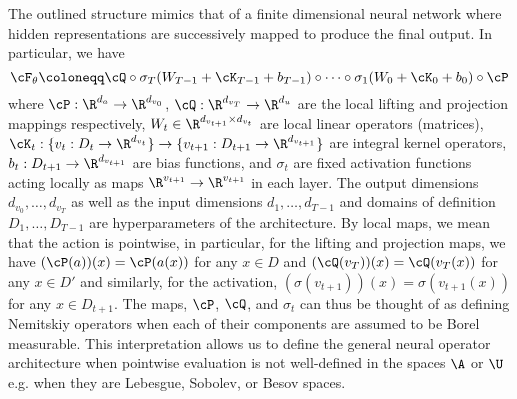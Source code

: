 The outlined structure mimics that of a finite dimensional neural network where hidden representations are successively mapped to produce the final output. In particular, we have
\begin{equation}
\label{eq:F}
    \cF_{\theta} \coloneqq \cQ \circ \sigma_T(W_{T-1} + \cK_{T-1} + b_{T-1}) \circ \cdots \circ \sigma_1(W_0 + \cK_0 + b_0) \circ \cP
\end{equation}
where \(\cP: \R^{d_a} \to \R^{d_{v_0}}\), \(\cQ: \R^{d_{v_T}} \to \R^{d_u}\) are the local lifting and projection mappings respectively, \(W_t \in \R^{d_{v_{t+1}} \times d_{v_t}}\) are local linear operators (matrices), \(\cK_t: \{v_t: D_t \to \R^{d_{v_t}}\} \to \{v_{t+1}: D_{t+1} \to \R^{d_{v_{t+1}}}\}\) are integral kernel operators, \(b_t : D_{t+1} \to \R^{d_{v_{t+1}}}\) are bias functions, and \(\sigma_t\) are fixed activation functions acting locally as maps \(\R^{v_{t+1}} \to \R^{v_{t+1}}\) in each layer. The output dimensions \(d_{v_0},\dots,d_{v_T}\) as well as the input dimensions \(d_1,\dots,d_{T-1}\) and domains of definition \(D_1,\dots,D_{T-1}\) are hyperparameters of the architecture. By local maps, we mean that the action is pointwise, in particular, for the lifting and projection maps, we have \((\cP(a))(x) = \cP(a(x))\) for any \(x \in D\) and  \((\cQ(v_T))(x) = \cQ(v_T(x))\) for any \(x \in D'\) and similarly, for the activation,
\((\sigma(v_{t+1}))(x) = \sigma(v_{t+1}(x))\) for any \(x \in D_{t+1}\).
The maps, \(\cP\), \(\cQ\), and \(\sigma_t\) can thus be thought of as defining Nemitskiy operators \citep[Chapters 6,7]{dudley2011concrete} when each of their components are assumed to be Borel measurable. This interpretation allows us to define the general neural operator architecture when pointwise evaluation is not well-defined in the spaces \(\A\) or \(\U\) e.g. when they are Lebesgue, Sobolev, or Besov spaces. 

